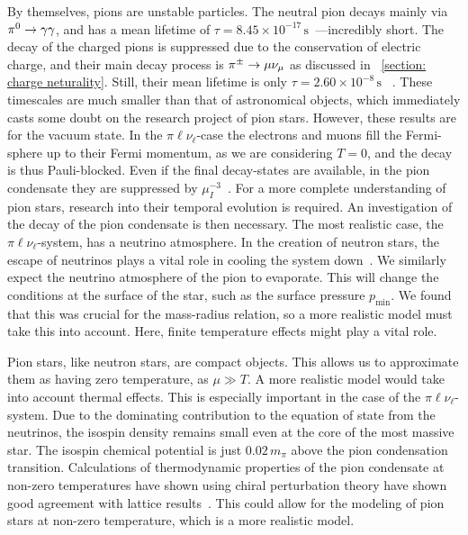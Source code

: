 By themselves, pions are unstable particles.
The neutral pion decays mainly via ${\pi^0}\rightarrow \gamma\gamma$, and has a mean lifetime of $\tau = 8.45\times 10^{-17}\,\text{s}$~\autocite{particledatagroupReviewParticlePhysics2020}---incredibly short.
The decay of the charged pions is suppressed due to the conservation of electric charge, and their main decay process is ${\pi^\pm}\rightarrow \mu \nu_\mu$ as discussed in
%
~\autoref{section: charge neturality}.
%
Still, their mean lifetime is only $\tau = 2.60\times 10^{-8}\,\text{s}$
%
~\autocite{particledatagroupReviewParticlePhysics2020}.
%
These timescales are much smaller than that of astronomical objects, which immediately casts some doubt on the research project of pion stars.
However, these results are for the vacuum state.
In the $\pi\ell\nu_\ell$-case the electrons and muons fill the Fermi-sphere up to their Fermi momentum, as we are considering $T = 0$, and the decay is thus Pauli-blocked.
Even if the final decay-states are available, in the pion condensate they are suppressed by $\mu_I^{-3}$~\autocite{brandtNewClassCompact2018}. 
For a more complete understanding of pion stars, research into their temporal evolution is required.
An investigation of the decay of the pion condensate is then necessary.
The most realistic case, the $\pi\ell\nu_\ell$-system, has a neutrino atmosphere.
In the creation of neutron stars, the escape of neutrinos plays a vital role in cooling the system down~\autocite{glendenningCompactStarsNuclear2012}.
We similarly expect the neutrino atmosphere of the pion to evaporate.
This will change the conditions at the surface of the star, such as the surface pressure $p_\text{min}$.
We found that this was crucial for the mass-radius relation, so a more realistic model must take this into account.
Here, finite temperature effects might play a vital role.


Pion stars, like neutron stars, are compact objects.
This allows us to approximate them as having zero temperature, as $\mu \gg T$.
A more realistic model would take into account thermal effects.
This is especially important in the case of the $\pi\ell\nu_\ell$-system.
Due to the dominating contribution to the equation of state from the neutrinos, the isospin density remains small even at the core of the most massive star.
The isospin chemical potential is just $0.02\,m_\pi$ above the pion condensation transition.
Calculations of thermodynamic properties of the pion condensate at non-zero temperatures have shown using chiral perturbation theory have shown good agreement with lattice results~\autocite{adhikariCondensatesPressureTwoflavor2021}.
This could allow for the modeling of pion stars at non-zero temperature, which is a more realistic model.


